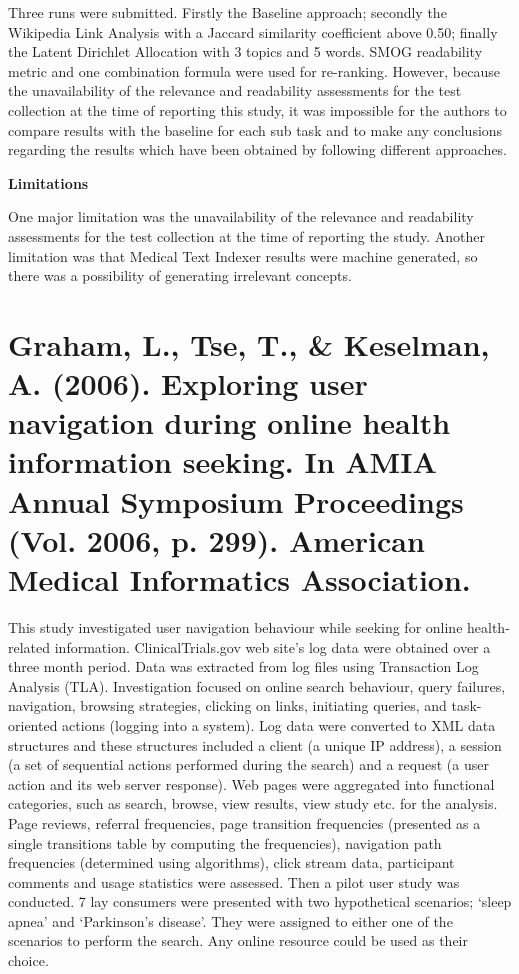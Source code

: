 \documentclass[]{article}
\begin{document}
Three runs were submitted. Firstly the Baseline approach; secondly the Wikipedia Link Analysis with a Jaccard similarity coefficient above 0.50; finally the Latent Dirichlet Allocation with 3 topics and 5 words. SMOG readability metric and one combination formula were used for re-ranking. However, because the unavailability of the relevance and readability assessments for the test collection at the time of reporting this study, it was impossible for the authors to compare results with the baseline for each sub task and to make any conclusions regarding the results which have been obtained by following different approaches.            

\textbf{Limitations}

One major limitation was the unavailability of the relevance and readability assessments for the test collection at the time of reporting the study. Another limitation was that Medical Text Indexer results were machine generated, so there was a possibility of generating irrelevant concepts.     

\section{Graham, L., Tse, T., \& Keselman, A. (2006). Exploring user navigation during online health information seeking. In AMIA Annual Symposium Proceedings (Vol. 2006, p. 299). American Medical Informatics Association.}

This study investigated user navigation behaviour while seeking for online health-related information. ClinicalTrials.gov web site's log data were obtained over a three month period. Data was extracted from log files using Transaction Log Analysis (TLA). Investigation focused on online search behaviour, query failures, navigation, browsing strategies, clicking on links, initiating queries, and task-oriented actions (logging into a system). Log data were converted to XML data structures and these structures included a client (a unique IP address), a session (a set of sequential actions performed during the search) and a request (a user action and its web server response). Web pages were aggregated into functional categories, such as search, browse, view results, view study etc. for the analysis. Page reviews, referral frequencies, page transition frequencies (presented as a single transitions table by computing the frequencies), navigation path frequencies (determined using algorithms), click stream data, participant comments and usage statistics were assessed. Then a pilot user study was conducted. 7 lay consumers were presented with two hypothetical scenarios; ‘sleep apnea’ and ‘Parkinson’s disease’. They were assigned to either one of the scenarios to perform the search. Any online resource could be used as their choice. 
\end{document}
